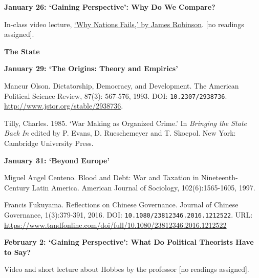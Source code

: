 \documentclass[letterpaper]{article}
\renewenvironment{itemize}{
  \begin{list}{}{
    \setlength{\leftmargin}{1.5em}
  }
}{
  \end{list}
}
\begin{document}
\begin{enumerate}
\begin{itemize}
		\item {\bf January 26: `Gaining Perspective': Why Do We Compare?}
			\begin{itemize}	
				\item[$\bullet$] In-class video lecture, \href{https://www.youtube.com/watch?v=jsZDlBU36n0}{`Why Nations Fails,' by James Robinson}. [no readings assigned].
			\end{itemize}

	\end{itemize}


\item {\bf The State}
	\begin{itemize}
		
	\item {\bf January 29: `The Origins: Theory and Empirics'}
		\begin{itemize} 
			\item[$\bullet$] Mancur Olson. Dictatorship, Democracy, and Development. The American Political Science Review, 87(3): 567-576, 1993. DOI: \texttt{10.2307/2938736}. \url{http://www.jstor.org/stable/2938736}.
			\item[$\bullet$] Tilly, Charles. 1985. `War Making as Organized Crime.' In \emph{Bringing the State Back In} edited by P. Evans, D. Rueschemeyer and T. Skocpol. New York: Cambridge University Press.
		\end{itemize}
		

	\item {\bf January 31: `Beyond Europe'}
		\begin{itemize} 
			\item[$\bullet$] Miguel Angel Centeno. Blood and Debt: War and Taxation in Nineteenth-Century Latin America. American Journal of Sociology, 102(6):1565-1605, 1997.
			\item[$\bullet$] Francis Fukuyama. Reflections on Chinese Governance. Journal of Chinese Governance, 1(3):379-391, 2016. DOI: \texttt{10.1080/23812346.2016.1212522}. URL: \url{https://www.tandfonline.com/doi/full/10.1080/23812346.2016.1212522}
		\end{itemize}

	\item {\bf  February 2: `Gaining Perspective': What Do Political Theorists Have to Say?}
		\begin{itemize} 
			\item[$\bullet$] Video and short lecture about Hobbes by the professor [no readings assigned].
		\end{itemize}



\end{itemize}
\end{enumerate}
\end{document}
